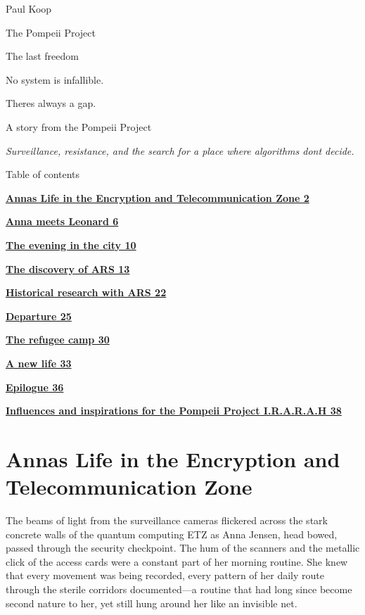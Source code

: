 \documentclass[
]{article}
\author{}
\date{}
\begin{document}
{
\setcounter{tocdepth}{3}
\tableofcontents
}
Paul Koop

The Pompeii Project

The last freedom

No system is infallible.

There\textquotesingle s always a gap.

A story from the Pompeii Project

\emph{Surveillance, resistance, and the search for a place where algorithms don\textquotesingle t decide.}

Table of contents

\hyperref[annas-life-in-the-encryption-and-telecommunication-zone]{\textbf{Anna\textquotesingle s Life in the Encryption and Telecommunication Zone 2}}

\hyperref[anna-meets-leonard]{\textbf{Anna meets Leonard 6}}

\hyperref[the-evening-in-the-city]{\textbf{The evening in the city 10}}

\hyperref[the-discovery-of-ars]{\textbf{The discovery of ARS 13}}

\hyperref[historical-research-with-ars]{\textbf{Historical research with ARS 22}}

\hyperref[departure]{\textbf{Departure 25}}

\hyperref[the-refugee-camp]{\textbf{The refugee camp 30}}

\hyperref[a-new-life]{\textbf{A new life 33}}

\hyperref[epilogue]{\textbf{Epilogue 36}}

\hyperref[influences-and-inspirations-for-the-pompeii-project-i.r.a.r.a.h]{\textbf{Influences and inspirations for the Pompeii Project I.R.A.R.A.H 38}}

\section{Anna\textquotesingle s Life in the Encryption and Telecommunication Zone}\label{annas-life-in-the-encryption-and-telecommunication-zone}

The beams of light from the surveillance cameras flickered across the stark concrete walls of the quantum computing ETZ as Anna Jensen, head bowed, passed through the security checkpoint. The hum of the scanners and the metallic click of the access cards were a constant part of her morning routine. She knew that every movement was being recorded, every pattern of her daily route through the sterile corridors documented---a routine that had long since become second nature to her, yet still hung around her like an invisible net.
\end{document}
